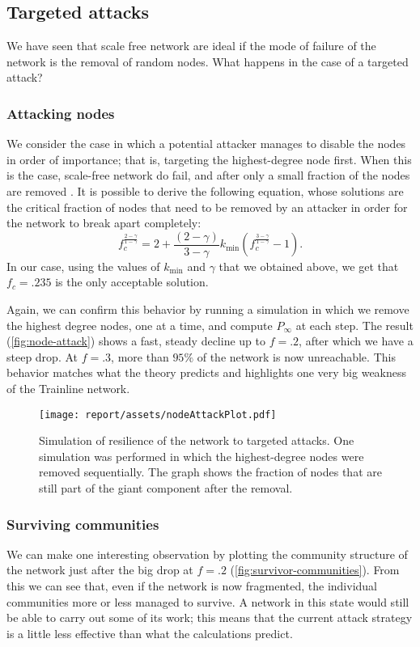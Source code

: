 \subsection{Targeted attacks}
We have seen that scale free network are ideal if the mode of failure of the network is the removal of random nodes. What happens in the case of a targeted attack? 

\subsubsection{Attacking nodes}
We consider the case in which a potential attacker manages to disable the nodes in order of importance; that is, targeting the highest-degree node first. When this is the case, scale-free network do fail, and after only a small fraction of the nodes are removed \cite{barabasi12}.
It is possible to derive \cite{barabasi240} the following equation, whose solutions are the critical fraction of nodes that need to be removed by an attacker in order for the network to break apart completely:
\begin{equation}
    f_c^{\frac{2-\gamma }{1-\gamma }}= 2+ \frac{(2-\gamma )} {3-\gamma } k_{\min } \left(f_c^{\frac{3-\gamma }{1-\gamma }}-1\right).
    \label{eq:fc-attack}
\end{equation}
In our case, using the values of $k_{\min}$ and $\gamma$ that we obtained above, we get that $f_c = .235$ is the only acceptable solution. 

Again, we can confirm this behavior by running a simulation in which we remove the highest degree nodes, one at a time, and compute $P_\infty$ at each step.
The result (\autoref{fig:node-attack}) shows a fast, steady decline up to $f=.2$, after which we have a steep drop. At $f=.3$, more than $95\%$ of the network is now unreachable. This behavior matches what the theory predicts and highlights one very big weakness of the Trainline network.

\begin{figure}[h]
    \centering
    \texttt{[image: report/assets/nodeAttackPlot.pdf]}
    \caption{Simulation of resilience of the network to targeted attacks. One simulation was performed in which the highest-degree nodes were removed sequentially. The graph shows the fraction of nodes that are still part of the giant component after the removal.}
    \label{fig:node-attack}
\end{figure}

\subsubsection{Surviving communities}
We can make one interesting observation by plotting the community structure of the network just after the big drop at $f=.2$ (\autoref{fig:survivor-communities}). From this we can see that, even if the network is now fragmented, the individual communities more or less managed to survive. A network in this state would still be able to carry out some of its work; this means that the current attack strategy is a little less effective than what the calculations predict.

